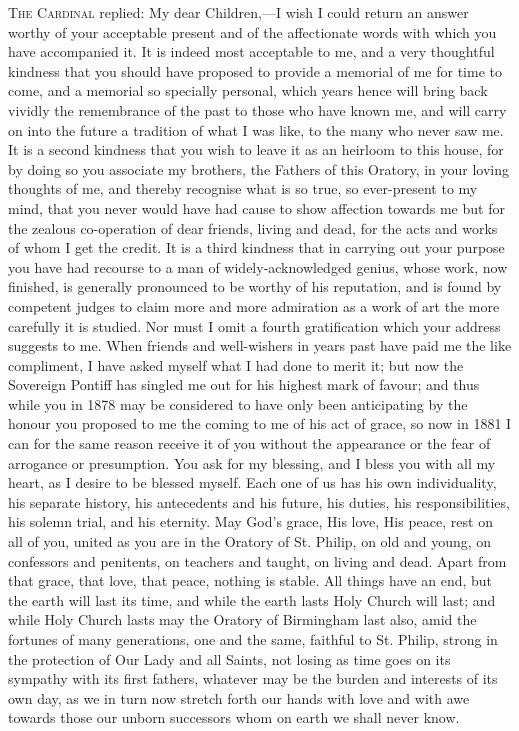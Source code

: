 T\textsc{he}
C\textsc{ardinal} replied: My dear Children,—I wish I
could return an answer worthy of your acceptable present and of the
affectionate words with which you have accompanied it. It is indeed
most acceptable to me, and a very thoughtful kindness that you should
have proposed to provide a memorial of me for time to come, and a
memorial so specially personal, which years hence will bring back
vividly the remembrance of the past to those who have known me, and
will carry on into the future a tradition of what I was like, to the
many who never saw me. It is a second kindness that you wish to leave
it as an heirloom to this house, for by doing so you associate my
brothers, the Fathers of this Oratory, in your loving thoughts of me,
and thereby recognise what is so true, so ever-present to my mind,
that you never would have had cause to show affection towards me but
for the zealous co-operation of dear friends, living and dead, for the
acts and works of whom I get the credit. It is a third kindness that
in carrying out your purpose you have had recourse to a man of
widely-acknowledged genius, whose work, now finished, is generally
pronounced to be worthy of his reputation, and is found by competent
judges to claim more and more admiration as a work of art the more
carefully it is studied. Nor must I omit a fourth gratification which
your address suggests to me. When friends and well-wishers in years
past have paid me the like compliment, I have asked myself what I had
done to merit it; but now the Sovereign Pontiff has singled me out for
his highest mark of favour; and thus while you in 1878 may be
considered to have only been anticipating by the honour you proposed
to me the coming to me of his act of grace, so now in 1881 I can for
the same reason receive it of you without the appearance or the fear
of arrogance or presumption. You ask for my blessing, and I bless you
with all my heart, as I desire to be blessed myself. Each one of us
has his own individuality, his separate history, his antecedents and
his future, his duties, his responsibilities, his solemn trial,
and his eternity. May God's grace, His love, His peace, rest on all of
you, united as you are in the Oratory of St. Philip, on old and young,
on confessors and penitents, on teachers and taught, on living and
dead. Apart from that grace, that love, that peace, nothing is stable.
All things have an end, but the earth will last its time, and while
the earth lasts Holy Church will last; and while Holy Church lasts may
the Oratory of Birmingham last also, amid the fortunes of many
generations, one and the same, faithful to St. Philip, strong in the
protection of Our Lady and all Saints, not losing as time goes on its
sympathy with its first fathers, whatever may be the burden and
interests of its own day, as we in turn now stretch forth our hands
with love and with awe towards those our unborn successors whom on
earth we shall never know.

